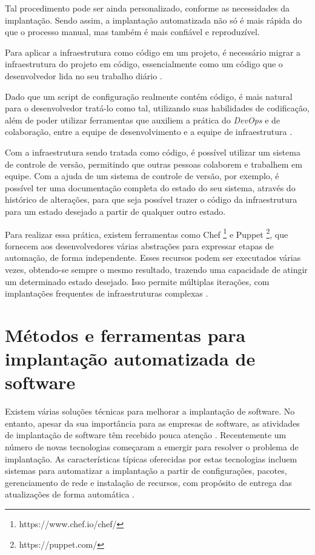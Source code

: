 Tal procedimento pode ser
ainda personalizado, conforme as necessidades da implantação. Sendo assim, a implantação
automatizada não só é mais rápida do que o processo manual, mas também é mais
confiável e reproduzível.

Para aplicar a infraestrutura como código em um projeto, é necessário
migrar a infraestrutura do projeto em código, essencialmente como um
código que o desenvolvedor lida no seu trabalho diário \cite{byhand}.

Dado que um script de configuração realmente contém código, é mais natural
para o desenvolvedor tratá-lo como tal, utilizando suas habilidades de codificação,
além de poder utilizar ferramentas que auxiliem a prática do \textit{DevOps} e de colaboração,
entre a equipe de desenvolvimento e a equipe de infraestrutura \cite{byhand}. 

Com a infraestrutura sendo tratada como código, é possível utilizar um
sistema de controle de versão, permitindo que outras pessoas colaborem e trabalhem em
equipe. Com a ajuda de um sistema de controle de versão, por exemplo, é possível 
ter uma documentação completa do estado do seu sistema, 
através do histórico de alterações, para que seja possível
trazer o código da infraestrutura para um estado desejado a partir de
qualquer outro estado.

Para realizar essa prática, existem ferramentas como Chef \footnote{https://www.chef.io/chef/} e 
Puppet \footnote{https://puppet.com/}, que
fornecem aos desenvolvedores várias abstrações para 
expressar etapas de automação,
de forma independente. Esses recursos podem ser executados várias vezes,
obtendo-se sempre o mesmo resultado, trazendo uma capacidade de atingir um determinado
estado desejado. Isso permite múltiplas iterações, 
com implantações frequentes de infraestruturas complexas
\cite{Hummer2013}.

\section{Métodos e ferramentas para implantação automatizada de software}
\label{subsec:metodoseferramentas}

Existem várias soluções técnicas para melhorar a implantação de software. No 
entanto, apesar da sua importância para as empresas de software, as atividades
de implantação de software têm recebido pouca atenção \cite{5741269}. Recentemente 
um número de novas tecnologias começaram a emergir para
resolver o problema de implantação. As características típicas oferecidas por
estas tecnologias incluem sistemas para automatizar a implantação a partir de
configurações, pacotes, gerenciamento de rede e instalação de recursos, com
propósito de entrega das atualizações de forma automática \cite{deployment1998}.

